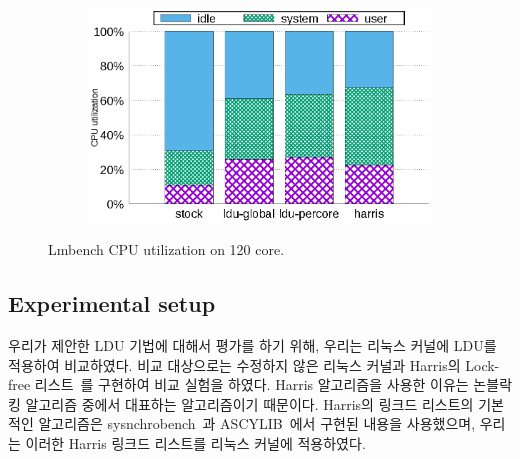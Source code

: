 \begin{figure}[tb]
    \centering
    \begin{subfigure}[b]{1\textwidth}
  \begin{center}
        \includegraphics[scale=0.8]{graph/lmbench_cpuutils.eps}
  \end{center}
    \end{subfigure}
        \centering
    \caption{Lmbench CPU utilization on 120 core.}
    \label{fig:utilization_lmbench}
    
\end{figure}



\subsection{Experimental setup}



우리가 제안한 LDU 기법에 대해서 평가를 하기 위해, 우리는 리눅스 커널에 LDU를 적용하여 비교하였다.
비교 대상으로는 수정하지 않은 리눅스 커널과 Harris의 Lock-free 리스트~\cite{Harris2001Lockfree}를
 구현하여 비교 실험을 하였다.
Harris 알고리즘을 사용한 이유는 논블락킹 알고리즘 중에서 대표하는 알고리즘이기 때문이다. 
Harris의 링크드 리스트의 기본적인 알고리즘은 sysnchrobench~\cite{Gramoli2015Synchrobench}과
ASCYLIB~\cite{David2015ASYNCHRONIZED}에서 구현된 내용을 사용했으며, 우리는 이러한 Harris 링크드 
리스트를  리눅스 커널에 적용하였다. 

